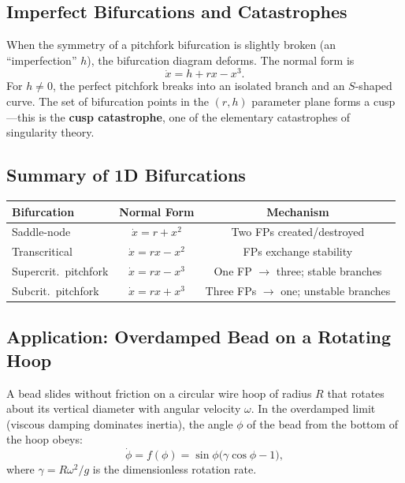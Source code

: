 \documentclass[11pt,letterpaper]{article}
\theoremstyle{definition}
\theoremstyle{plain}
\theoremstyle{remark}
\newcommand{\xdot}{\dot{x}}
\begin{document}
\subsection{Imperfect Bifurcations and Catastrophes}

When the symmetry of a pitchfork bifurcation is slightly broken (an
``imperfection'' $h$), the bifurcation diagram deforms.  The normal form is
\begin{equation}
  \xdot = h + rx - x^3.
\end{equation}
For $h\neq 0$, the perfect pitchfork breaks into an isolated branch and an
$S$-shaped curve.  The set of bifurcation points in the $(r,h)$ parameter
plane forms a cusp---this is the \textbf{cusp catastrophe}, one of the
elementary catastrophes of singularity theory.

\subsection{Summary of 1D Bifurcations}

\begin{center}
\begin{tabular}{@{}lcc@{}}
\toprule
\textbf{Bifurcation} & \textbf{Normal Form} & \textbf{Mechanism} \\
\midrule
Saddle-node     & $\xdot = r + x^2$       & Two FPs created/destroyed \\
Transcritical   & $\xdot = rx - x^2$      & FPs exchange stability \\
Supercrit.\ pitchfork & $\xdot = rx - x^3$ & One FP $\to$ three; stable branches \\
Subcrit.\ pitchfork   & $\xdot = rx + x^3$ & Three FPs $\to$ one; unstable branches \\
\bottomrule
\end{tabular}
\end{center}

\subsection{Application: Overdamped Bead on a Rotating Hoop}\label{sec:bead-hoop}

A bead slides without friction on a circular wire hoop of radius $R$ that
rotates about its vertical diameter with angular velocity $\omega$.  In the
overdamped limit (viscous damping dominates inertia), the angle $\phi$ of
the bead from the bottom of the hoop obeys:
\begin{equation}
  \dot{\phi} = f(\phi) = \sin\phi\bigl(\gamma\cos\phi - 1\bigr),
\end{equation}
where $\gamma = R\omega^2/g$ is the dimensionless rotation rate.
\end{document}
